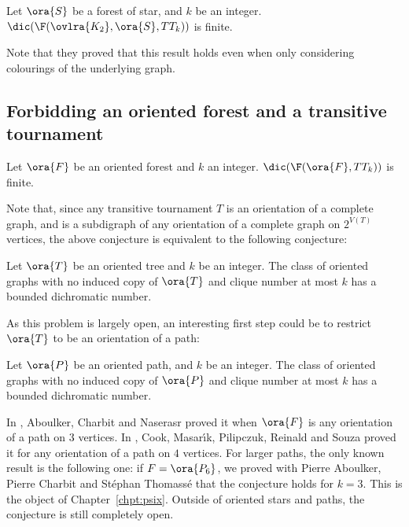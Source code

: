 \begin{theorem}[\cite{CS19}]
    Let $\ora{S}$ be a forest of star, and $k$ be an integer. $\dic(\F(\ovlra{K_2},\ora{S},TT_k))$ is finite.
\end{theorem}

Note that they proved that this result holds even when only considering colourings of the underlying graph.

\subsection{Forbidding an oriented forest and a transitive tournament}

\begin{conjecture}
    Let $\ora{F}$ be an oriented forest and $k$ an integer. $\dic(\F(\ora{F}, TT_{k}))$ is finite.
\end{conjecture}

Note that, since any transitive tournament $T$ is an orientation of a complete graph, and is a subdigraph of any orientation of a complete graph on $2^{V(T)}$ vertices, the above conjecture is equivalent to the following conjecture: %

\begin{conjecture}
    Let $\ora{T}$ be an oriented tree and $k$ be an integer. The class of oriented graphs with no induced copy of $\ora{T}$ and clique number at most $k$ has a bounded dichromatic number.
\end{conjecture}

As this problem is largely open, an interesting first step could be to restrict $\ora{T}$ to be an orientation of a path:

\begin{conjecture}
    Let $\ora{P}$ be an oriented path, and $k$ be an integer. The class of oriented graphs with no induced copy of $\ora{P}$ and clique number at most $k$ has a bounded dichromatic number.
\end{conjecture}

In \cite{ACN21}, Aboulker, Charbit and Naserasr proved it when $\ora{F}$ is any orientation of a path on $3$ vertices. In \cite{CMPRS22}, Cook, Masar{\'{\i}}k, Pilipczuk, Reinald and Souza proved it for any orientation of a path on $4$ vertices. For larger paths, the only known result is the following one: if $F = \ora{P_6}$, we proved with Pierre Aboulker, Pierre Charbit and Stéphan Thomassé that the conjecture holds for $k = 3$. This is the object of Chapter~\ref{chpt:psix}. Outside of oriented stars and paths, the conjecture is still completely open.

